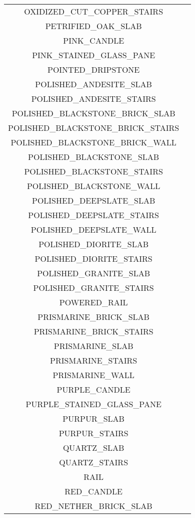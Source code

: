 \begin{longtable}{ |c|c| }
	OXIDIZED\_CUT\_COPPER\_STAIRS & \xmark \\
	PETRIFIED\_OAK\_SLAB & \xmark \\
	PINK\_CANDLE & \xmark \\
	PINK\_STAINED\_GLASS\_PANE & \xmark \\
	POINTED\_DRIPSTONE & \xmark \\
	POLISHED\_ANDESITE\_SLAB & \xmark \\
	POLISHED\_ANDESITE\_STAIRS & \xmark \\
	POLISHED\_BLACKSTONE\_BRICK\_SLAB & \xmark \\
	POLISHED\_BLACKSTONE\_BRICK\_STAIRS & \xmark \\
	POLISHED\_BLACKSTONE\_BRICK\_WALL & \xmark \\
	POLISHED\_BLACKSTONE\_SLAB & \xmark \\
	POLISHED\_BLACKSTONE\_STAIRS & \xmark \\
	POLISHED\_BLACKSTONE\_WALL & \xmark \\
	POLISHED\_DEEPSLATE\_SLAB & \xmark \\
	POLISHED\_DEEPSLATE\_STAIRS & \xmark \\
	POLISHED\_DEEPSLATE\_WALL & \xmark \\
	POLISHED\_DIORITE\_SLAB & \xmark \\
	POLISHED\_DIORITE\_STAIRS & \xmark \\
	POLISHED\_GRANITE\_SLAB & \xmark \\
	POLISHED\_GRANITE\_STAIRS & \xmark \\
	POWERED\_RAIL & \xmark \\
	PRISMARINE\_BRICK\_SLAB & \xmark \\
	PRISMARINE\_BRICK\_STAIRS & \xmark \\
	PRISMARINE\_SLAB & \xmark \\
	PRISMARINE\_STAIRS & \xmark \\
	PRISMARINE\_WALL & \xmark \\
	PURPLE\_CANDLE & \xmark \\
	PURPLE\_STAINED\_GLASS\_PANE & \xmark \\
	PURPUR\_SLAB & \xmark \\
	PURPUR\_STAIRS & \xmark \\
	QUARTZ\_SLAB & \xmark \\
	QUARTZ\_STAIRS & \xmark \\
	RAIL & \xmark \\
	RED\_CANDLE & \xmark \\
	RED\_NETHER\_BRICK\_SLAB & \xmark \\

\end{longtable}
